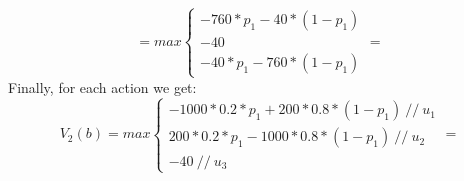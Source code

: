 \documentclass[english]{scrartcl}
\begin{document}
  \[
     =max\left\{
                \begin{array}{ll}
                  -760*p_1-40*(1-p_1)\\
                  -40\\
                  -40*p_1-760*(1-p_1)
                \end{array}
              \right.=
  \]
Finally, for each action we get:
\[
     V_2(b)=max\left\{
                \begin{array}{ll}
                  -1000*0.2*p_1+200*0.8*(1-p_1) \ // \ u_1\\
                  200*0.2*p_1-1000*0.8*(1-p_1) \ // \ u_2\\
                  -40 \ // \ u_3
                \end{array}
              \right.=
  \]
\end{document}
